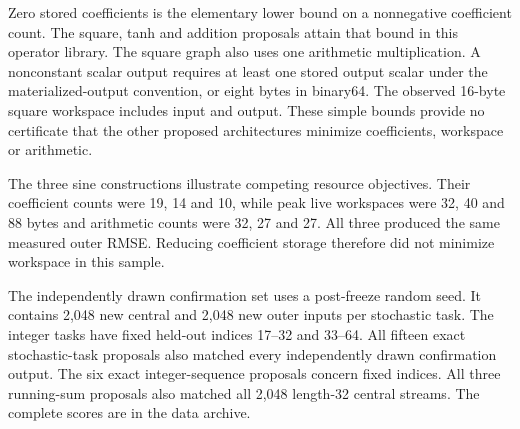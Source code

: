 Zero stored coefficients is the elementary lower bound on a nonnegative coefficient count. The square, tanh and addition proposals attain that bound in this operator library. The square graph also uses one arithmetic multiplication. A nonconstant scalar output requires at least one stored output scalar under the materialized-output convention, or eight bytes in binary64. The observed 16-byte square workspace includes input and output. These simple bounds provide no certificate that the other proposed architectures minimize coefficients, workspace or arithmetic.

The three sine constructions illustrate competing resource objectives. Their coefficient counts were 19, 14 and 10, while peak live workspaces were 32, 40 and 88 bytes and arithmetic counts were 32, 27 and 27. All three produced the same measured outer RMSE. Reducing coefficient storage therefore did not minimize workspace in this sample.

The independently drawn confirmation set uses a post-freeze random seed. It contains 2,048 new central and 2,048 new outer inputs per stochastic task. The integer tasks have fixed held-out indices 17--32 and 33--64. All fifteen exact stochastic-task proposals also matched every independently drawn confirmation output. The six exact integer-sequence proposals concern fixed indices. All three running-sum proposals also matched all 2,048 length-32 central streams. The complete scores are in the data archive.

